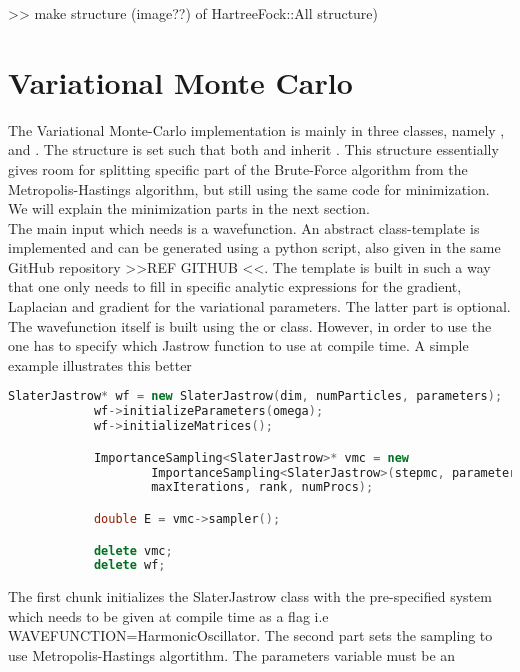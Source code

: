     >> make structure (image??) of HartreeFock::All structure)

\section{Variational Monte Carlo}
    The Variational Monte-Carlo implementation is mainly in three classes,
    namely ,  and
    . The structure is set such that both
     and  inherit
    . This structure essentially gives room for splitting
    specific part of the Brute-Force algorithm from the Metropolis-Hastings
    algorithm, but still using the same code for minimization. We will explain
    the minimization parts in the next section. \\ 
    The main input which  needs is a wavefunction. An abstract
    class-template is implemented and can be generated using a python script,
    also given in the same GitHub repository >>REF GITHUB <<. The template is
    built in such a way that one only needs to fill in specific analytic
    expressions for the gradient, Laplacian and gradient for the variational
    parameters. The latter part is optional. \\ 
    The wavefunction itself is built using the  or
     class. However, in order to use the
     one has to specify which Jastrow function to use
    at compile time. A simple example illustrates this better
        \begin{lstlisting}[language=C++, style=ccstyle]
            SlaterJastrow* wf = new SlaterJastrow(dim, numParticles, parameters);
            wf->initializeParameters(omega);
            wf->initializeMatrices();

            ImportanceSampling<SlaterJastrow>* vmc = new
                    ImportanceSampling<SlaterJastrow>(stepmc, parameters,
                    maxIterations, rank, numProcs);

            double E = vmc->sampler();

            delete vmc;
            delete wf;
        \end{lstlisting}
    The first chunk initializes the SlaterJastrow class with the pre-specified
    system which needs to be given at compile time as a flag i.e
    WAVEFUNCTION=HarmonicOscillator. The second part sets the sampling to use
    Metropolis-Hastings algortithm. The parameters variable must be an
